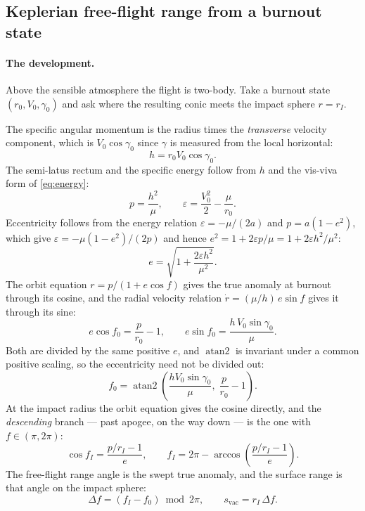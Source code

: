 \documentclass[11pt]{article}
\begin{document}
\subsection{Keplerian free-flight range from a burnout state}
\label{sec:kepler}

\paragraph{The development.} Above the sensible atmosphere the flight is
two-body. Take a burnout state $(r_0, V_0, \gamma_0)$ and ask where the
resulting conic meets the impact sphere $r = r_I$.

The specific angular momentum is the radius times the \emph{transverse}
velocity component, which is $V_0\cos\gamma_0$ since $\gamma$ is measured from
the local horizontal:
\begin{equation}
  h = r_0 V_0 \cos\gamma_0 .
  \label{eq:kh}
\end{equation}
The semi-latus rectum and the specific energy follow from $h$ and the vis-viva
form of \eqref{eq:energy}:
\begin{equation}
  p = \frac{h^2}{\mu}, \qquad
  \varepsilon = \frac{V_0^2}{2} - \frac{\mu}{r_0} .
  \label{eq:kpe}
\end{equation}
Eccentricity follows from the energy relation $\varepsilon = -\mu/(2a)$ and
$p = a(1-e^2)$, which give $\varepsilon = -\mu(1-e^2)/(2p)$ and hence
$e^2 = 1 + 2\varepsilon p/\mu = 1 + 2\varepsilon h^2/\mu^2$:
\begin{equation}
  e = \sqrt{1 + \frac{2\varepsilon h^2}{\mu^2}} .
  \label{eq:ke}
\end{equation}
The orbit equation $r = p/(1+e\cos f)$ gives the true anomaly at burnout
through its cosine, and the radial velocity relation
$\dot r = (\mu/h)\,e\sin f$ gives it through its sine:
\begin{equation}
  e\cos f_0 = \frac{p}{r_0} - 1 , \qquad
  e\sin f_0 = \frac{h\,V_0\sin\gamma_0}{\mu} .
\end{equation}
Both are divided by the same positive $e$, and $\operatorname{atan2}$ is
invariant under a common positive scaling, so the eccentricity need not be
divided out:
\begin{equation}
  f_0 = \operatorname{atan2}\!\left(\frac{h V_0\sin\gamma_0}{\mu},\;
        \frac{p}{r_0} - 1\right).
  \label{eq:kf0}
\end{equation}
At the impact radius the orbit equation gives the cosine directly, and the
\emph{descending} branch --- past apogee, on the way down --- is the one with
$f \in (\pi, 2\pi)$:
\begin{equation}
  \cos f_I = \frac{p/r_I - 1}{e} , \qquad
  f_I = 2\pi - \arccos\!\left(\frac{p/r_I - 1}{e}\right).
  \label{eq:kfI}
\end{equation}
The free-flight range angle is the swept true anomaly, and the surface range is
that angle on the impact sphere:
\begin{equation}
  \Delta f = (f_I - f_0)\bmod 2\pi , \qquad
  s_{\text{vac}} = r_I\,\Delta f .
  \label{eq:krange}
\end{equation}
\end{document}
